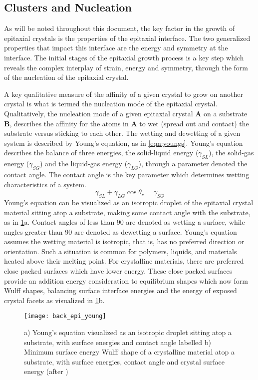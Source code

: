 \subsection{Clusters and Nucleation} As will be noted throughout this document, the key factor in the growth of epitaxial crystals is the properties of the epitaxial interface.
The two generalized properties that impact this interface are the energy and symmetry at the interface.
The initial stages of the epitaxial growth process is a key step which reveals the complex interplay of strain, energy and symmetry, through the form of the nucleation of the epitaxial crystal.

A key qualitative measure of the affinity of a given crystal to grow on another crystal is what is termed the nucleation mode of the epitaxial crystal.
Qualitatively, the nucleation mode of a given epitaxial crystal \textbf{A} on a substrate \textbf{B}, describes the affinity for the atoms in \textbf{A} to wet (spread out and contact) the substrate versus sticking to each other.
The wetting and dewetting of a given system is described by Young's equation, as in \cref{eqn:youngs}.
Young's equation describes the balance of three energies, the solid-liquid energy (\(\gamma_{SL}\)), the solid-gas energy (\(\gamma_{SG}\)) and the liquid-gas energy (\(\gamma_{LG}\)), through a parameter denoted the contact angle.
The contact angle is the key parameter which determines wetting characteristics of a system.
\begin{equation}
 \gamma_{SL} + \gamma_{LG} \cos{\theta_c} = \gamma_{SG} \label{eqn:youngs}
\end{equation}
Young's equation can be visualized as an isotropic droplet of the epitaxial crystal material sitting atop a substrate, making some contact angle with the substrate, as in \cref{fig:back_epi_young}a.
Contact angles of less than 90\degree{} are denoted as wetting a surface, while angles greater than 90\degree{} are denoted as dewetting a surface.
Young's equation assumes the wetting material is isotropic, that is, has no preferred direction or orientation.
Such a situation is common for polymers, liquids, and materials heated above their melting point.
For crystalline materials, there are preferred close packed surfaces which have lower energy.
These close packed surfaces provide an addition energy consideration to equilibrium shapes which now form Wulff shapes, balancing surface interface energies and the energy of exposed crystal facets\cite{Venables1984} as visualized in \cref{fig:back_epi_young}b.
\begin{figure}
 \centering \texttt{[image: back\_epi\_young]}
 \caption[Young's equation]{\label{fig:back_epi_young}a) Young's equation visualized as an isotropic droplet sitting atop a substrate, with surface energies and contact angle labelled b) Minimum surface energy Wulff shape of a crystalline material atop a substrate, with surface energies, contact angle and crystal surface energy (after \cite{wikipedia_surface_energy})}
\end{figure}

